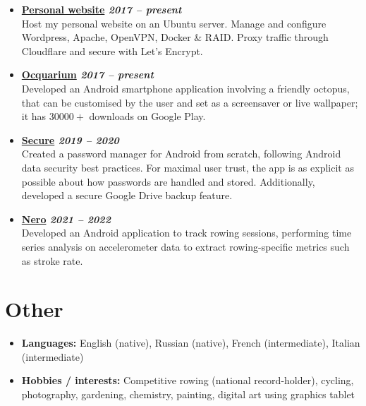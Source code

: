\documentclass[11pt,twoside,a4paper]{book}
\newcommand{\cvdate}[1] {\hfill {\color{gray} \mdseries \slshape \normalsize #1}}
\begin{document}
\begin{itemize}  

  \item {\bfseries \large \href{https://zeevox.net}{Personal website} \cvdate{2017 -- present}} \\
    Host my personal website on an \mbox{Ubuntu} server. Manage and configure \mbox{Wordpress}, \mbox{Apache}, \mbox{OpenVPN}, \mbox{Docker} \& \mbox{RAID}. Proxy traffic through \mbox{Cloudflare} and secure with Let's Encrypt.

\item {\bfseries \large \href{https://github.com/ZeevoX/Ocquarium}{Ocquarium} \cvdate{2017 -- present}} \\
Developed an Android smartphone application involving a friendly octopus, that can be customised by the user and set as a screensaver or live wallpaper; it has $30000+$ downloads on Google Play.

\item {\bfseries \large \href{https://github.com/ZeevoX/Secure}{Secure} \cvdate{2019 -- 2020}} \\
Created a password manager for Android from scratch, following Android data security best practices. For maximal user trust, the app is as explicit as possible about how passwords are handled and stored. Additionally, developed a secure Google Drive backup feature.


\item {\bfseries \large \href{https://github.com/ZeevoX/nearow}{Nero} \cvdate{2021 -- 2022}} \\
Developed an Android application to track rowing sessions, performing time series analysis on accelerometer data to extract rowing-specific metrics such as stroke rate.

\end{itemize}

\section*{Other}

\begin{itemize}
  \itemsep0em
  \item \textbf{Languages:} English (native), Russian (native), French (intermediate), Italian (intermediate)
  \item \textbf{Hobbies / interests:} Competitive rowing (national record-holder), cycling, photography, gardening, chemistry, painting, digital art using graphics tablet
\end{itemize}
\end{document}
